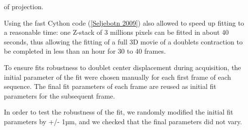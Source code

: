 \documentclass[A4paperpaper,11pt,english]{sphinxmanual}
\begin{document}
of projection.

Using the fast Cython code ({\hyperref[index-latex:seljebotn2009]{{[}Seljebotn  2009{]}}}) also allowed to speed
up fitting to a reasonable time: one Z-stack of 3 millions pixels can be fitted
in about 40 seconds, thus allowing the fitting of a full 3D movie of a doublets
contraction to be completed in less than an hour for 30 to 40 frames.

To ensure fits robustness to doublet center displacement during
acquisition, the initial parameter of the fit were chosen manually for each
first frame of each sequence. The final fit parameters of each frame are reused
as initial fit parameters for the subsequent frame.

In order to test the robustness of the fit, we randomly modified the initial fit parameters by +/- 1µm, and we checked that the final parameters did
not vary.
\end{document}
